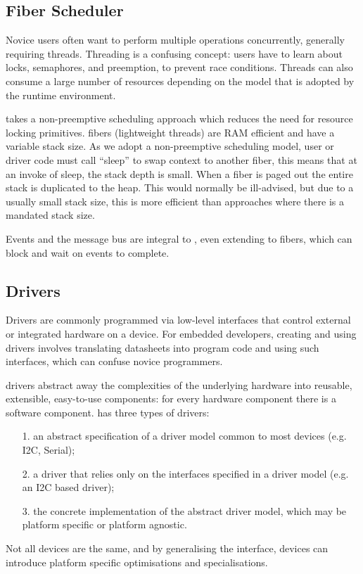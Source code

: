 
\subsection{Fiber Scheduler}
Novice users often want to perform multiple operations concurrently, generally requiring threads. 
Threading is a confusing concept: users have to learn about locks, semaphores, and preemption, to prevent race conditions. Threads can also consume a large number of resources depending on the model that is adopted by the runtime environment.

\CO takes a non-preemptive scheduling approach which reduces the need for resource locking primitives. \CO fibers (lightweight threads) are RAM efficient and have a variable stack size. As we adopt a non-preemptive scheduling model, user or driver code must call ``sleep'' to swap context to another fiber, this means that at an invoke of sleep, the stack depth is small. When a fiber is paged out the entire stack is duplicated to the heap. This would normally be ill-advised, but due to a usually small stack size, this is more efficient than approaches where there is a mandated stack size.

Events and the message bus are integral to \CON, even extending to fibers, which can block and wait on events to complete. 

\subsection{Drivers}

Drivers are commonly programmed via low-level interfaces that control external or integrated hardware on a device. For embedded developers, creating and using drivers involves translating datasheets into program code and using such interfaces, which can confuse novice programmers.

\CO drivers abstract away the complexities of the underlying hardware into reusable, extensible, easy-to-use components: for every hardware component there is a software component. \CO has three types of drivers:
\begin{itemize}
    \item[1.] an abstract specification of a driver model common to most devices (e.g. I2C, Serial);
    \item[2.] a driver that relies only on the interfaces specified in a driver model  (e.g. an I2C based driver);
    \item[3.] the concrete implementation of the abstract driver model, which may be platform specific or platform agnostic.
\end{itemize}
Not all devices are the same, and by generalising the interface, devices can introduce platform specific optimisations and specialisations.

